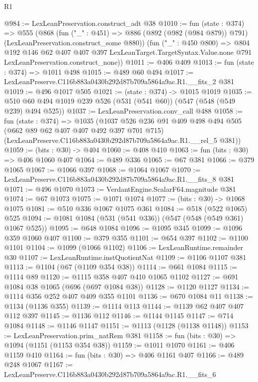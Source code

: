 \begin{lexlean}{R1}
\begin{coremodule}
@984 := LexLeanPreservation.construct_adt @38
@1010 := fun (state : @374) =>
  @555
    (@868
      (fun ("_" : @451) =>
      @886 (@892 (@982 (@984 @879)) @791) (LexLeanPreservation.construct_some @880))
      (fun ("_" : @450 @800) =>
      @804
        @192
        @146
        @62
        @407
        @407
        @397
        LexLeanTarget.TargetSyntax.Value.none
        @791
        LexLeanPreservation.construct_none))
@1011 := @406 @409
@1013 := fun (state : @374) => @1011 @498
@1015 := @489 @60 @494
@1017 := LexLeanPreserve.C116b883a0430b292d87b709a5864a9ac.R1.__fits_2 @381
@1019 := @496 @1017 @505
@1021 := (state : @374) -> @1015 @1019
@1035 := @510 @60 @494 @1019 @239 @526 (@531 (@541 @60)) (@547 (@548 (@549 @239) @494 @525))
@1037 := LexLeanPreservation.conv_call @488
@1058 := fun (state : @374) =>
  @1035
    (@1037
      @526
      @236
      @91
      @409
      @498
      @494
      @505
      (@662 @89 @62 @407 @407 @492 @397 @701 @715)
      (LexLeanPreserve.C116b883a0430b292d87b709a5864a9ac.R1.__rel_5 @381))
@1059 := (bits : @30) -> @404
@1060 := @408 @410
@1063 := fun (bits : @30) => @406 @1060 @407
@1064 := @489 @336
@1065 := @67 @381
@1066 := @379 @1065
@1067 := @1066 @397
@1068 := @1064 @1067
@1070 := LexLeanPreserve.C116b883a0430b292d87b709a5864a9ac.R1.__fits_8 @381
@1071 := @496 @1070
@1073 := VerdantEngine.ScalarF64.magnitude @381
@1074 := @67 @1073
@1075 := @1071 @1074
@1077 := (bits : @30) -> @1068 @1075
@1081 := @510 @336 @1067 @1075 @361
@1084 := @518 (@522 @1065) @525
@1094 := @1081 @1084 (@531 (@541 @336)) (@547 (@548 (@549 @361) @1067 @525))
@1095 := @648 @1084
@1096 := @1095 @345
@1099 := @1096 @359 @1060 @407
@1100 := @379 @355
@1101 := @654 @397
@1102 := @1100 @1101
@1104 := @1099 (@1066 @1102)
@1106 := LexLeanRuntime.remainder @30
@1107 := LexLeanRuntime.instQuotientNat
@1109 := @1106 @1107 @381
@1113 := @1104 (@67 (@1109 @354 @38))
@1114 := @661 @1084
@1115 := @1114 @89
@1120 := @1115 @358 @407 @410 @1065 @1102
@1127 := @691 @1084 @38 @1065 (@696 (@697 @1084 @38))
@1128 := @1120 @1127
@1134 := @1114 @356 @252 @407 @409 @355 @1101
@1136 := @670 @1084 @11
@1138 := @1134 (@1136 @355)
@1139 := @1114 @113
@1144 := @1139 @62 @407 @407 @112 @397
@1145 := @1136 @112
@1146 := @1144 @1145
@1147 := @714 @1084
@1148 := @1146 @1147
@1151 := @1113 (@1128 (@1138 @1148))
@1153 := LexLeanPreservation.prim_natRem @381
@1158 := fun (bits : @30) => @1094 (@1151 (@1153 @354 @38))
@1159 := @1011 @1070
@1161 := @406 @1159 @410
@1164 := fun (bits : @30) => @406 @1161 @407
@1166 := @489 @248 @1067
@1167 := LexLeanPreserve.C116b883a0430b292d87b709a5864a9ac.R1.__fits_6

\end{coremodule}
\end{lexlean}
